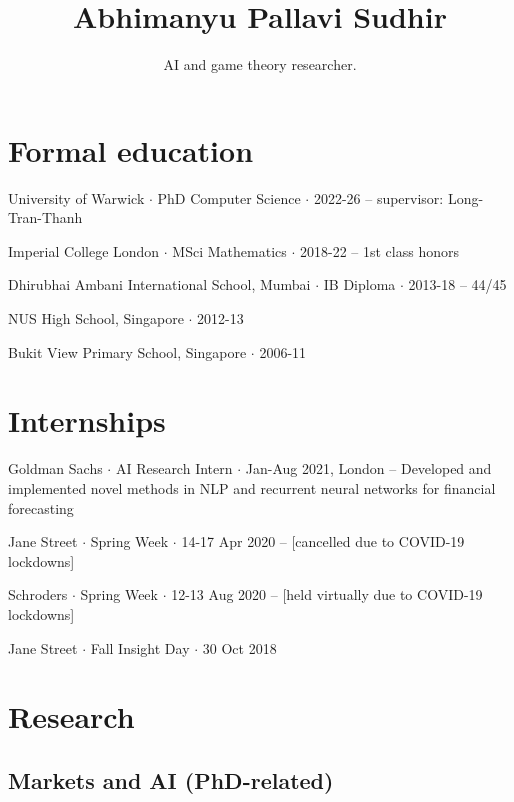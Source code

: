 \documentclass{article}
\title{\Large\bf Abhimanyu Pallavi Sudhir}
\subtitle{AI and game theory researcher. \\ %
\vspace{-2em}}
\newcommand{\archive}{\color{lightgray}}
\begin{document}
\begingroup
\let\center\flushleft
\let\endcenter\endflushleft
\maketitle
\endgroup

\section*{Formal education}
\begin{itemize}
    \item University of Warwick $\cdot$ PhD Computer Science $\cdot$ 2022-26 -- supervisor: Long-Tran-Thanh %
    \item Imperial College London $\cdot$ MSci Mathematics $\cdot$ 2018-22 -- 1st class honors
          {\archive
    \item Dhirubhai Ambani International School, Mumbai $\cdot$ IB Diploma $\cdot$ 2013-18 -- 44/45
    \item NUS High School, Singapore $\cdot$ 2012-13
    \item Bukit View Primary School, Singapore $\cdot$ 2006-11
          }
\end{itemize}

\section*{Internships}
\begin{itemize}
    \item Goldman Sachs $\cdot$ AI Research Intern $\cdot$ Jan-Aug 2021, London -- Developed and implemented novel methods in NLP and recurrent neural networks for financial forecasting
          {\archive
    \item Jane Street $\cdot$ Spring Week $\cdot$ 14-17 Apr 2020 -- [cancelled due to COVID-19 lockdowns]
    \item Schroders $\cdot$ Spring Week $\cdot$ 12-13 Aug 2020 -- [held virtually due to COVID-19 lockdowns]
    \item Jane Street $\cdot$ Fall Insight Day $\cdot$ 30 Oct 2018
          }
\end{itemize}

\section*{Research}

\subsection*{Markets and AI (PhD-related)}
\end{document}
